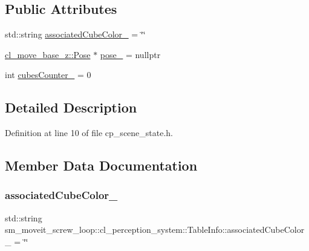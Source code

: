 \subsection*{Public Attributes}
\begin{DoxyCompactItemize}
\item 
std\+::string \hyperlink{structsm__moveit__screw__loop_1_1cl__perception__system_1_1TableInfo_a2ea2d6d945b29d2eff4ed3e631b114b9}{associated\+Cube\+Color\+\_\+} = \char`\"{}\char`\"{}
\item 
\hyperlink{classcl__move__base__z_1_1Pose}{cl\+\_\+move\+\_\+base\+\_\+z\+::\+Pose} $\ast$ \hyperlink{structsm__moveit__screw__loop_1_1cl__perception__system_1_1TableInfo_a53e37ebebdf6a01e7b542b22f947d32a}{pose\+\_\+} = nullptr
\item 
int \hyperlink{structsm__moveit__screw__loop_1_1cl__perception__system_1_1TableInfo_ae1473d306a001e77e8913f3aadb26f53}{cubes\+Counter\+\_\+} = 0
\end{DoxyCompactItemize}


\subsection{Detailed Description}


Definition at line 10 of file cp\+\_\+scene\+\_\+state.\+h.



\subsection{Member Data Documentation}
\mbox{\label{structsm__moveit__screw__loop_1_1cl__perception__system_1_1TableInfo_a2ea2d6d945b29d2eff4ed3e631b114b9}} 
\subsubsection{\texorpdfstring{associated\+Cube\+Color\+\_\+}{associatedCubeColor\_}}
{\footnotesize\ttfamily std\+::string sm\+\_\+moveit\+\_\+screw\+\_\+loop\+::cl\+\_\+perception\+\_\+system\+::\+Table\+Info\+::associated\+Cube\+Color\+\_\+ = \char`\"{}\char`\"{}}



